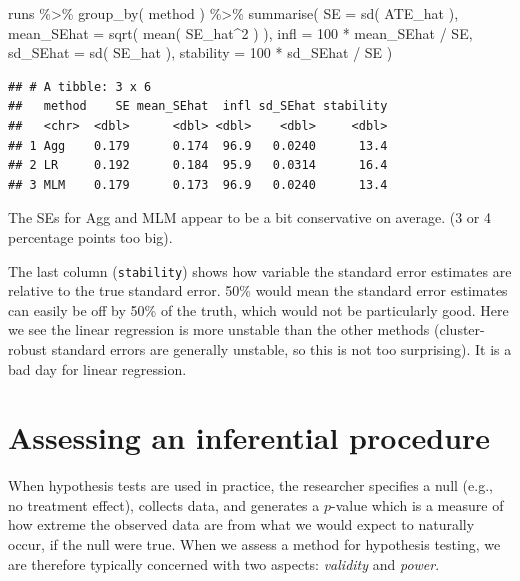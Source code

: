 \documentclass[
]{book}
\newenvironment{Shaded}{\begin{snugshade}}{\end{snugshade}}
\newcommand{\AttributeTok}[1]{\textcolor[rgb]{0.77,0.63,0.00}{#1}}
\newcommand{\DecValTok}[1]{\textcolor[rgb]{0.00,0.00,0.81}{#1}}
\newcommand{\FunctionTok}[1]{\textcolor[rgb]{0.00,0.00,0.00}{#1}}
\newcommand{\NormalTok}[1]{#1}
\newcommand{\SpecialCharTok}[1]{\textcolor[rgb]{0.00,0.00,0.00}{#1}}
\begin{document}
\begin{Shaded}
\begin{Highlighting}[]
\NormalTok{runs }\SpecialCharTok{\%\textgreater{}\%}  \FunctionTok{group\_by}\NormalTok{( method ) }\SpecialCharTok{\%\textgreater{}\%}
  \FunctionTok{summarise}\NormalTok{( }
    \AttributeTok{SE =} \FunctionTok{sd}\NormalTok{( ATE\_hat ),}
    \AttributeTok{mean\_SEhat =} \FunctionTok{sqrt}\NormalTok{( }\FunctionTok{mean}\NormalTok{( SE\_hat}\SpecialCharTok{\^{}}\DecValTok{2}\NormalTok{ ) ),}
    \AttributeTok{infl =} \DecValTok{100} \SpecialCharTok{*}\NormalTok{ mean\_SEhat }\SpecialCharTok{/}\NormalTok{ SE,}
    \AttributeTok{sd\_SEhat =} \FunctionTok{sd}\NormalTok{( SE\_hat ),}
    \AttributeTok{stability =} \DecValTok{100} \SpecialCharTok{*}\NormalTok{ sd\_SEhat }\SpecialCharTok{/}\NormalTok{ SE )}
\end{Highlighting}
\end{Shaded}

\begin{verbatim}
## # A tibble: 3 x 6
##   method    SE mean_SEhat  infl sd_SEhat stability
##   <chr>  <dbl>      <dbl> <dbl>    <dbl>     <dbl>
## 1 Agg    0.179      0.174  96.9   0.0240      13.4
## 2 LR     0.192      0.184  95.9   0.0314      16.4
## 3 MLM    0.179      0.173  96.9   0.0240      13.4
\end{verbatim}

The SEs for Agg and MLM appear to be a bit conservative on average. (3 or 4 percentage points too big).

The last column (\texttt{stability}) shows how variable the standard error estimates are relative to the true standard error.
50\% would mean the standard error estimates can easily be off by 50\% of the truth, which would not be particularly good.
Here we see the linear regression is more unstable than the other methods (cluster-robust standard errors are generally unstable, so this is not too surprising).
It is a bad day for linear regression.

\hypertarget{assessing-an-inferential-procedure}{%
\section{Assessing an inferential procedure}\label{assessing-an-inferential-procedure}}

When hypothesis tests are used in practice, the researcher specifies a null (e.g., no treatment effect), collects data, and generates a \(p\)-value which is a measure of how extreme the observed data are from what we would expect to naturally occur, if the null were true.
When we assess a method for hypothesis testing, we are therefore typically concerned with two aspects: \emph{validity} and \emph{power}.
\end{document}
